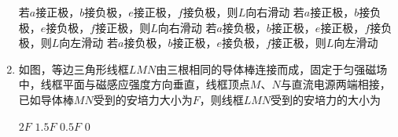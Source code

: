 \begin{enumerate}[leftmargin=0em]
\fourchoices
{若$ a $接正极，$ b $接负极，$ e $接正极，$ f $接负极，则$ L $向右滑动}
{若$ a $接正极，$ b $接负极，$ e $接负极，$ f $接正极，则$ L $向右滑动}
{若$ a $接负极，$ b $接正极，$ e $接正极，$ f $接负极，则$ L $向左滑动}
{若$ a $接负极，$ b $接正极，$ e $接负极，$ f $接正极，则$ L $向左滑动}
	
\item
{}
如图，等边三角形线框$ LMN $由三根相同的导体棒连接而成，固定于匀强磁场中，线框平面与磁感应强度方向垂直，线框顶点$ M $、$ N $与直流电源两端相接，已如导体棒$ MN $受到的安培力大小为$ F $，则线框$ LMN $受到的安培力的大小为  
\begin{figure}[h!]
	\centering
	
\end{figure}

\fourchoices
{$ 2F $}
{$ 1.5F $}
{$ 0.5F $}
{$ 0 $}
	

	
\end{enumerate}





